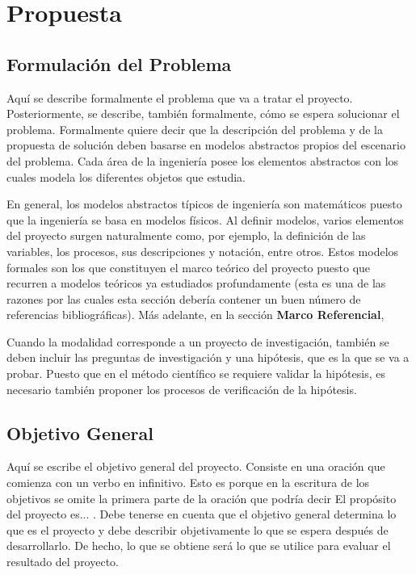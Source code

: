 \documentclass{article}
\begin{document}
\section*{\sc Propuesta}
\subsection*{Formulación del Problema}
\noindent Aquí se describe formalmente el problema que va a tratar el proyecto. Posteriormente, se describe, también formalmente, cómo se espera solucionar el problema. Formalmente quiere decir que la descripción del problema y de la propuesta de solución deben basarse en modelos abstractos propios del escenario del problema. Cada área de la ingeniería posee los elementos abstractos con los cuales modela los diferentes objetos que estudia.

En general, los modelos abstractos típicos de ingeniería son matemáticos puesto que la ingeniería se basa en modelos físicos. Al definir modelos, varios elementos del proyecto surgen naturalmente como, por ejemplo, la definición de las variables, los procesos, sus descripciones y notación, entre otros. Estos modelos formales son los que constituyen el marco teórico del proyecto puesto que recurren a modelos teóricos ya estudiados profundamente (esta es una de las razones por las cuales esta sección debería contener un buen número de referencias bibliográficas). %
Más adelante, en la sección {\bf Marco Referencial}, 

Cuando la modalidad corresponde a un proyecto de investigación, también se deben incluir las preguntas de investigación y una hipótesis, que es la que se va a probar. Puesto que en el método científico se requiere validar la hipótesis, es necesario también proponer los procesos de verificación de la hipótesis.

\subsection*{Objetivo General}
\noindent Aquí se escribe el objetivo general del proyecto. Consiste en una oración que comienza con un verbo en infinitivo. Esto es porque en la escritura de los objetivos se omite la primera parte de la oración que podría decir \guillemotleft El propósito del proyecto es... \guillemotright. Debe tenerse en cuenta que el objetivo general determina lo que es el proyecto y debe describir objetivamente lo que se espera después de desarrollarlo. De hecho, lo que se obtiene será lo que se utilice para evaluar el resultado del proyecto. %
\end{document}
